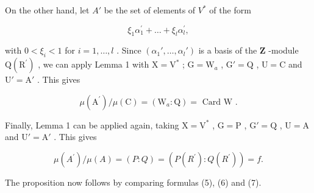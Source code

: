 On the other hand, let \(A'\) be the set of elements of \(V^{*}\) of the form

\[
\xi_ {1} \alpha_ {1} ^ {\prime} + \dots + \xi_ {l} \alpha_ {l} ^ {\prime},
\]

with \(0 < \xi_i < 1\) for \(i = 1, \ldots, l\) . Since \((\alpha_1', \ldots, \alpha_l')\) is a basis of the \(\mathbf{Z}\) -module \(\mathrm{Q}(\mathrm{R}^{\prime})\) , we can apply Lemma 1 with \(\mathrm{X} = \mathrm{V}^*\) ; \(\mathrm{G} = \mathrm{W}_a\) , \(\mathrm{G}' = \mathrm{Q}\) , \(\mathrm{U} = \mathrm{C}\) and \(\mathrm{U}' = \mathrm{A}'\) . This gives

\[
\mu \left(\mathrm{A} ^ {\prime}\right) / \mu (\mathrm{C}) = \left(\mathrm{W} _ {a}: \mathrm{Q}\right) = \text { Card   W }.\tag{6}
\]

Finally, Lemma 1 can be applied again, taking \(\mathrm{X} = \mathrm{V}^*\) , \(\mathrm{G} = \mathrm{P}\) , \(\mathrm{G}' = \mathrm{Q}\) , \(\mathrm{U} = \mathrm{A}\) and \(\mathrm{U}' = \mathrm{A}'\) . This gives

\[
\mu (A ^ {\prime}) / \mu (A) = (P: Q) = (P (R ^ {\prime}): Q (R ^ {\prime})) = f.\tag{7}
\]

The proposition now follows by comparing formulas (5), (6) and (7).

